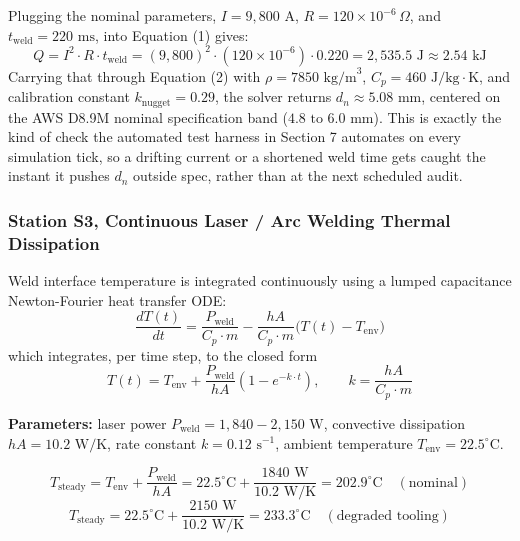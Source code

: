 \documentclass[11pt]{article}
\begin{document}
\begin{tcolorbox}[colback=lightbg,colframe=sylasblue,arc=1mm,title={\small Worked Example, Nominal Weld Check},coltitle=white,colbacktitle=sylasblue,fonttitle=\bfseries]
\small
Plugging the nominal parameters, $I = 9{,}800\text{ A}$, $R = 120\times 10^{-6}\,\Omega$, and $t_{\text{weld}} = 220\text{ ms}$, into Equation (1) gives:
\begin{equation}
Q = I^2 \cdot R \cdot t_{\text{weld}} = (9{,}800)^2 \cdot (120 \times 10^{-6}) \cdot 0.220 = 2{,}535.5\text{ J} \approx 2.54\text{ kJ}
\end{equation}
Carrying that through Equation (2) with $\rho = 7850\text{ kg/m}^3$, $C_p = 460\text{ J/kg}\cdot\text{K}$, and calibration constant $k_{\text{nugget}} = 0.29$, the solver returns $d_n \approx 5.08\text{ mm}$, centered on the AWS D8.9M nominal specification band ($4.8\text{ to } 6.0\text{ mm}$). This is exactly the kind of check the automated test harness in Section 7 automates on every simulation tick, so a drifting current or a shortened weld time gets caught the instant it pushes $d_n$ outside spec, rather than at the next scheduled audit.
\end{tcolorbox}

\subsubsection{Station S3, Continuous Laser / Arc Welding Thermal Dissipation}

Weld interface temperature is integrated continuously using a lumped capacitance Newton-Fourier heat transfer ODE:
\begin{equation}
\frac{dT(t)}{dt} = \frac{P_{\text{weld}}}{C_p \cdot m} - \frac{hA}{C_p \cdot m}\big(T(t) - T_{\text{env}}\big)
\end{equation}
which integrates, per time step, to the closed form
\begin{equation}
T(t) = T_{\text{env}} + \frac{P_{\text{weld}}}{hA}\left(1 - e^{-k \cdot t}\right), \qquad k = \frac{hA}{C_p \cdot m}
\end{equation}

\textbf{Parameters:} laser power $P_{\text{weld}} = 1{,}840 - 2{,}150\text{ W}$, convective dissipation $hA = 10.2\text{ W/K}$, rate constant $k = 0.12\text{ s}^{-1}$, ambient temperature $T_{\text{env}} = 22.5^\circ\text{C}$.

\begin{equation}
T_{\text{steady}} = T_{\text{env}} + \frac{P_{\text{weld}}}{hA} = 22.5^\circ\text{C} + \frac{1840\text{ W}}{10.2\text{ W/K}} = 202.9^\circ\text{C} \quad (\text{nominal})
\end{equation}
\begin{equation}
T_{\text{steady}} = 22.5^\circ\text{C} + \frac{2150\text{ W}}{10.2\text{ W/K}} = 233.3^\circ\text{C} \quad (\text{degraded tooling})
\end{equation}
\end{document}
